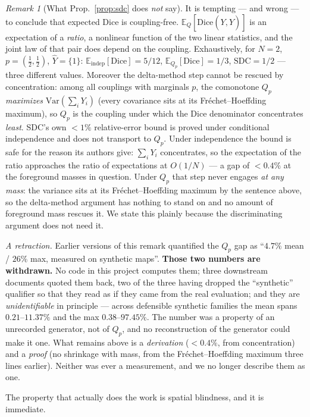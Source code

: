 \documentclass[11pt]{article}
\theoremstyle{remark}
\newtheorem{remark}{Remark}
\newcommand{\Yhat}{\widehat{Y}}
\newcommand{\Dice}{\mathrm{Dice}}
\newcommand{\SDC}{\mathrm{SDC}}
\newcommand{\Ex}{\mathbb{E}}
\begin{document}
\begin{remark}[What Prop.~\ref{prop:sdc} does \emph{not} say]\label{rem:notcoupling}
It is tempting --- and wrong --- to conclude that expected Dice is coupling-free.
$\Ex_Q[\Dice(Y,\Yhat)]$ is an expectation of a \emph{ratio}, a nonlinear function of
the two linear statistics, and the joint law of that pair does depend on the
coupling. Exhaustively, for $N=2$, $p=(\tfrac12,\tfrac12)$, $\Yhat=\{1\}$:
$\Ex_{\mathrm{indep}}[\Dice]=5/12$, $\Ex_{Q_p}[\Dice]=1/3$, $\SDC=1/2$ --- three
different values. Moreover the delta-method step cannot be rescued by
concentration: among all couplings with marginals $p$, the comonotone $Q_p$
\emph{maximizes} $\mathrm{Var}(\sum_i Y_i)$ (every covariance sits at its
Fr\'echet--Hoeffding maximum), so $Q_p$ is the coupling under which the Dice
denominator concentrates \emph{least}. SDC's own $<\!1\%$ relative-error bound is
proved under conditional independence \cite[eq.~30]{sdc} and does not transport to
$Q_p$. Under independence the bound is safe for the reason its authors give: $\sum_i
Y_i$ concentrates, so the expectation of the ratio approaches the ratio of expectations
at $O(1/N)$ --- a gap of $<\!0.4\%$ at the foreground masses in question. Under $Q_p$
that step never engages \emph{at any mass}: the variance sits at its
Fr\'echet--Hoeffding maximum by the sentence above, so the delta-method argument has
nothing to stand on and no amount of foreground mass rescues it. We state this plainly
because the discriminating argument does not need it.

\emph{A retraction.} Earlier versions of this remark quantified the $Q_p$ gap as
``$4.7\%$ mean / $26\%$ max, measured on synthetic maps''. \textbf{Those two numbers are
withdrawn.} No code in this project computes them; three downstream documents quoted
them back, two of the three having dropped the ``synthetic'' qualifier so that they read
as if they came from the real evaluation; and they are \emph{unidentifiable} in
principle --- across defensible synthetic families the mean spans $0.21$--$11.37\%$ and
the max $0.38$--$97.45\%$. The number was a property of an unrecorded generator, not of
$Q_p$, and no reconstruction of the generator could make it one. What remains above is a
\emph{derivation} ($<\!0.4\%$, from concentration) and a \emph{proof} (no shrinkage with
mass, from the Fr\'echet--Hoeffding maximum three lines earlier). Neither was ever a
measurement, and we no longer describe them as one.
\end{remark}

The property that actually does the work is spatial blindness, and it is immediate.
\end{document}
